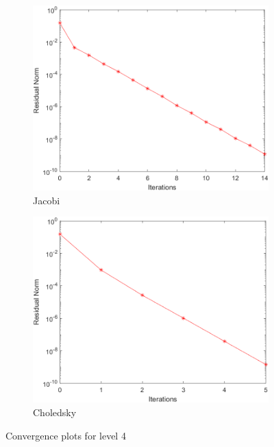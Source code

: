 \documentclass[a4paper, 11pt]{article}
\begin{document}
				\begin{figure}[H]
					\begin{subfigure}{.49\textwidth}
						\centering
						\includegraphics[width=.99\linewidth]{img4/J.png}  
						\caption{Jacobi}
						\label{fig:Jacobi_4}
					\end{subfigure}
					\begin{subfigure}{.49\textwidth}
						\centering
						\includegraphics[width=.99\linewidth]{img4/C.png}  
						\caption{Choledsky}
						\label{fig:Chol_4}
					\end{subfigure}
					\caption{Convergence plots for level 4}
					\label{fig:fig4}
				\end{figure}
				
\end{document}

